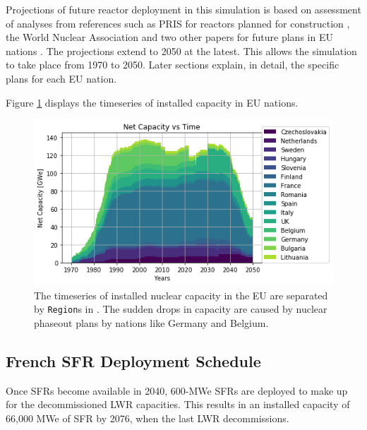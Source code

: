 Projections of future reactor deployment in this simulation is based on assessment of analyses
from references such as \gls{PRIS} for reactors planned for construction \cite{iaea_nuclear_2017},
the World Nuclear Association and two other papers for future plans in EU nations
\cite{world_nuclear_association_nuclear_2017, joskow_future_2012, hatch_politics_2015}.
The projections extend to 2050 at the latest. This allows the simulation to take place from
1970 to 2050. Later sections explain, in detail, the specific plans for each \gls{EU} nation.

Figure \ref{fig:eu_pow} displays the
timeseries of installed capacity in \gls{EU} nations.

\begin{figure}[htbp!]
	\begin{center}
		\includegraphics[scale=0.7]{./images/eu_future/power_plot.png}
	\end{center}
	\caption{The timeseries of installed nuclear capacity in the EU are separated by \texttt{Region}s in \Cyclus.
			 The sudden drops in capacity are caused by nuclear phaseout plans by nations like Germany and Belgium.
			 }
	\label{fig:eu_pow}
\end{figure}
\FloatBarrier

\subsection{French \gls{SFR} Deployment Schedule}

Once \glspl{SFR} become available in 2040,
600-MWe \glspl{SFR} are deployed to make up for the 
decommissioned \gls{LWR} capacities. 
This results in an installed capacity of 66,000 MWe
of \gls{SFR} by 2076, when the last \gls{LWR} decommissions.

